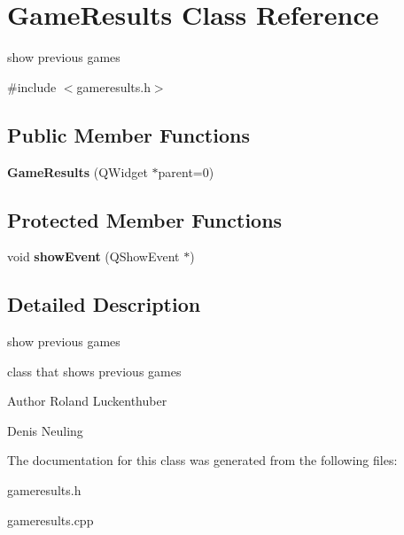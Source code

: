 \hypertarget{classGameResults}{\section{\-Game\-Results \-Class \-Reference}
\label{classGameResults}
}


show previous games  




{\ttfamily \#include $<$gameresults.\-h$>$}

\subsection*{\-Public \-Member \-Functions}
\begin{DoxyCompactItemize}
\item 
\hypertarget{classGameResults_a1d267b8278b4a65f384a29f2c194cc2c}{{\bfseries \-Game\-Results} (\-Q\-Widget $\ast$parent=0)}\label{classGameResults_a1d267b8278b4a65f384a29f2c194cc2c}

\end{DoxyCompactItemize}
\subsection*{\-Protected \-Member \-Functions}
\begin{DoxyCompactItemize}
\item 
\hypertarget{classGameResults_a33935ceabbb695bfdeb955b2a5167448}{void {\bfseries show\-Event} (\-Q\-Show\-Event $\ast$)}\label{classGameResults_a33935ceabbb695bfdeb955b2a5167448}

\end{DoxyCompactItemize}


\subsection{\-Detailed \-Description}
show previous games 

class that shows previous games

\begin{DoxyAuthor}{\-Author}
\-Roland \-Luckenthuber 

\-Denis \-Neuling 
\end{DoxyAuthor}


\-The documentation for this class was generated from the following files\-:\begin{DoxyCompactItemize}
\item 
gameresults.\-h\item 
gameresults.\-cpp\end{DoxyCompactItemize}
